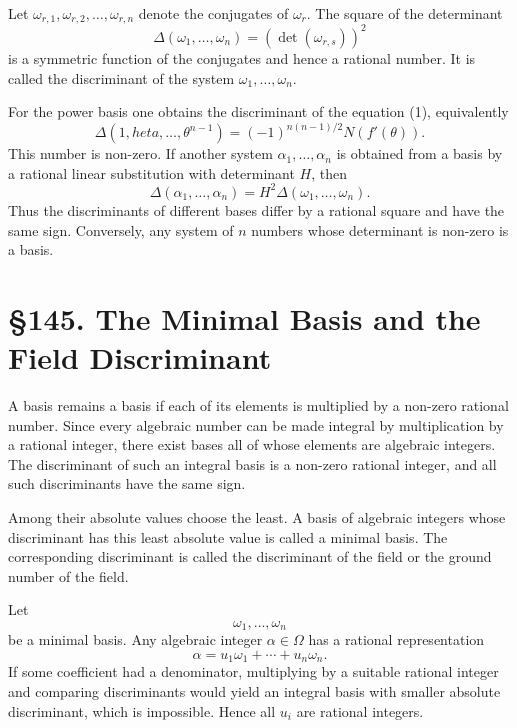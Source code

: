 \documentclass[12pt,a4paper]{article}
\newcommand{\webersection}[2]{\clearpage\section*{\S #1. #2}}
\begin{document}
Let \(\omega_{r,1},
\omega_{r,2},
\ldots,
\omega_{r,n}\) denote the conjugates of \(\omega_r\).  The square of the determinant
\begin{equation}
 \Delta(\omega_1,
\ldots,
\omega_n)=
\left(\det(\omega_{r,s})\right)^2 \tag{4}
\end{equation}
is a symmetric function of the conjugates and hence a rational number.  It is called the discriminant of the system \(\omega_1,
\ldots,
\omega_n\).

For the power basis one obtains the discriminant of the equation (1), equivalently
\begin{equation}
 \Delta(1,	heta,
\ldots,
\theta^{n-1})=(-1)^{n(n-1)/2}N(f'(\theta)). \tag{5}
\end{equation}
This number is non-zero.  If another system \(\alpha_1,
\ldots,
\alpha_n\) is obtained from a basis by a rational linear substitution with determinant \(H\), then
\begin{equation}
 \Delta(\alpha_1,
\ldots,
\alpha_n)=H^2\Delta(\omega_1,
\ldots,
\omega_n). \tag{6}
\end{equation}
Thus the discriminants of different bases differ by a rational square and have the same sign.  Conversely, any system of \(n\) numbers whose determinant is non-zero is a basis.

\webersection{145}{The Minimal Basis and the Field Discriminant}

A basis remains a basis if each of its elements is multiplied by a non-zero rational number.  Since every algebraic number can be made integral by multiplication by a rational integer, there exist bases all of whose elements are algebraic integers.  The discriminant of such an integral basis is a non-zero rational integer, and all such discriminants have the same sign.

Among their absolute values choose the least.  A basis of algebraic integers whose discriminant has this least absolute value is called a minimal basis.  The corresponding discriminant is called the discriminant of the field or the ground number of the field.

Let
\[
 \omega_1,
\ldots,
\omega_n
\]
be a minimal basis.  Any algebraic integer \(\alpha\in\Omega\) has a rational representation
\[
 \alpha=u_1\omega_1+
\cdots+u_n\omega_n.
\]
If some coefficient had a denominator, multiplying by a suitable rational integer and comparing discriminants would yield an integral basis with smaller absolute discriminant, which is impossible.  Hence all \(u_i\) are rational integers.
\end{document}
